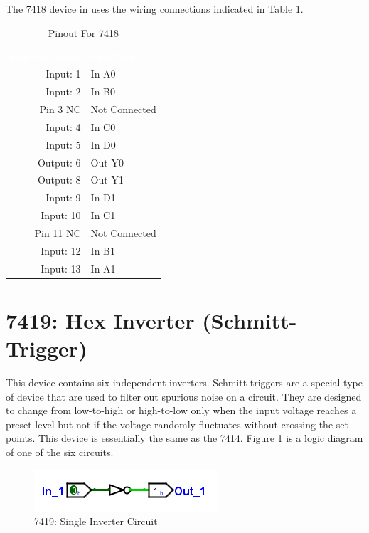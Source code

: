The 7418 device in \LE uses the wiring connections indicated in Table \ref{tab:50-7418}.

\begin{table}[H]
	\sffamily
	\newcommand{\head}[1]{\textcolor{white}{\textbf{#1}}}		
	\begin{center}
		\begin{tabular}{rl} 
			\rowcolor{black!75}
			\head{Logisim Label} & \head{Function} \\
			Input: 1   & In A0  \\
			Input: 2   & In B0  \\
			Pin 3 NC   & Not Connected \\
			Input: 4   & In C0  \\
			Input: 5   & In D0  \\
			Output: 6  & Out Y0 \\
			Output: 8  & Out Y1 \\
			Input: 9   & In D1  \\
			Input: 10  & In C1  \\
			Pin 11 NC  & Not Connected \\
			Input: 12 & In B1  \\
			Input: 13  & In A1  \\
		\end{tabular}
	\end{center}
	\caption{Pinout For 7418}
	\label{tab:50-7418}
\end{table}

\section{7419: Hex Inverter (Schmitt-Trigger)}

This device contains six independent inverters. Schmitt-triggers are a special type of device that are used to filter out spurious noise on a circuit. They are designed to change from low-to-high or high-to-low only when the input voltage reaches a preset level but not if the voltage randomly fluctuates without crossing the set-points. This device is essentially the same as the 7414. Figure \ref{fig:app_ttl-7419} is a logic diagram of one of the six circuits.

\begin{figure}[H]
	\centering
	\includegraphics{gfx/app_ttl-7404}
	\caption{7419: Single Inverter Circuit}
	\label{fig:app_ttl-7419}
\end{figure}

